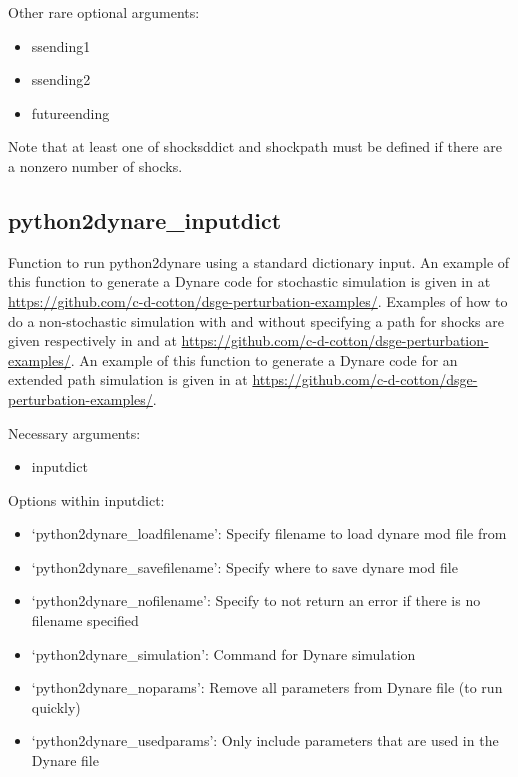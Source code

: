 \documentclass{article}
\theoremstyle{definition}
\begin{document}
Other rare optional arguments:
\begin{itemize}
    \item ssending1
    \item ssending2
    \item futureending
\end{itemize}

Note that at least one of shocksddict and shockpath must be defined if there are a nonzero number of shocks.





\subsection{python2dynare\_inputdict}
Function to run python2dynare using a standard dictionary input. An example of this function to generate a Dynare code for stochastic simulation is given in  at \url{https://github.com/c-d-cotton/dsge-perturbation-examples/}. Examples of how to do a non-stochastic simulation with and without specifying a path for shocks are given respectively in  and  at \url{https://github.com/c-d-cotton/dsge-perturbation-examples/}. An example of this function to generate a Dynare code for an extended path simulation is given in  at \url{https://github.com/c-d-cotton/dsge-perturbation-examples/}.

Necessary arguments:
\begin{itemize}
    \item inputdict
\end{itemize}

Options within inputdict:
\begin{itemize}
    \item `python2dynare\_loadfilename': Specify filename to load dynare mod file from
    \item `python2dynare\_savefilename': Specify where to save dynare mod file
    \item `python2dynare\_nofilename': Specify to not return an error if there is no filename specified
    \item `python2dynare\_simulation': Command for Dynare simulation
    \item `python2dynare\_noparams': Remove all parameters from Dynare file (to run quickly)
    \item `python2dynare\_usedparams': Only include parameters that are used in the Dynare file
\end{itemize}
\end{document}
